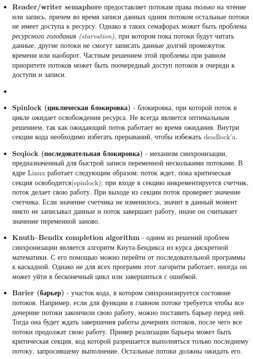 {\begin{itemize}
			\item\textbf{Reader/writer semaphore} предоставляет потокам права \textit{только} на чтение или запись, причем во время записи данных одним потоком остальные потоки не имеет доступа к ресурсу. Однако в таких семафорах может быть проблема \textit{ресурсного голодания (starvation)}, при котором пока потоки будут читать данные, другие потоки не смогут записать данные долгий промежуток времени или наоборот. Частным решением этой проблемы при равном приоритете потоков может быть поочередный доступ потоков в очереди к доступи и записи.
			\item{}
			\item\textbf{Spinlock (циклическая блокировка)} - блокировка, при которой поток в цикле ожидает освобождения ресурса. Не всегда является оптимальным решением, так как ожидающий поток работает во время ожидания. Внутри секции кода необходимо избегать прерываний, чтобы избежать deadlock'a.
			\item\textbf{Seqlock (последовательная блокировка)} - механизм синхронизации, предназначенный для быстрой записи переменной несколькими потоками. В ядре Linux работает следующим образом: поток ждет, пока критическая секция освободится(spinlock); при входе в секцию инкрементируется счетчик, поток делает свою работу. При выходе из секции поток проверяет значение счетчика. Если значение счетчика не изменилось, значит в данный момент никто не записывал данные и поток завершает работу, иначе он считывает значение переменной заново.
			\item\textbf{Knuth–Bendix сompletion algorithm} - одним из решений проблем синхронизации является алгоритм Кнута-Бендикса из курса дискретной математики. С его помощью можно перейти от последовательной программы к каскадной. Однако не для всех программ этот лагоритм работает, иногда он может уйти в бесконечный цикл или завершиться с ошибкой.
			\item\textbf{Barier (барьер)} - участок кода, в котором синхронизируется состояние потоков. Например, если для функции в главном потоке требуется чтобы все дочерние потоки закончили свою работу, можно поставить барьер перед ней. Тогда она будет ждать завершения работы дочерних потоков, после чего все потоки продолжат свою работу. Пример реализации барьера может быть критическая секция, код которой разрешается выполняться только последнему потоку, запросившему выполнение. Остальные потоки должны ожидать его.

\end{itemize}}
